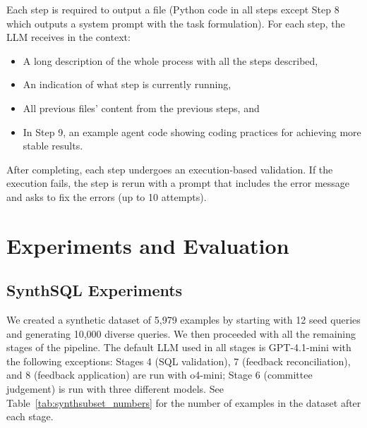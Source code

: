 \documentclass[11pt]{article}
\newcommand{\synthsubset}{SynthSQL\xspace}
\begin{document}
Each step is required to output a file (Python code in all steps except Step 8 which outputs a system prompt with the task formulation). For each step, the LLM receives in the context:
\begin{itemize}
    \item A long description of the whole process with all the steps described,
    \item An indication of what step is currently running,
    \item All previous files' content from the previous steps, and
    \item In Step 9, an example agent code showing coding practices for achieving more stable results.
\end{itemize}
After completing, each step undergoes an execution-based validation. If the execution fails, the step is rerun with a prompt that includes the error message and asks to fix the errors (up to 10 attempts).

\section{Experiments and Evaluation}

\subsection{\synthsubset Experiments}

We created a synthetic dataset of 5,979 examples by starting with 12 seed queries and generating 10,000 diverse queries. We then proceeded with all the remaining stages of the pipeline. The default LLM used in all stages is GPT-4.1-mini with the following exceptions: Stages 4 (SQL validation), 7 (feedback reconciliation), and 8 (feedback application) are run with o4-mini; Stage 6 (committee judgement) is run with three different models. See Table~\ref{tab:synthsubset_numbers} for the number of examples in the dataset after each stage.
\end{document}
